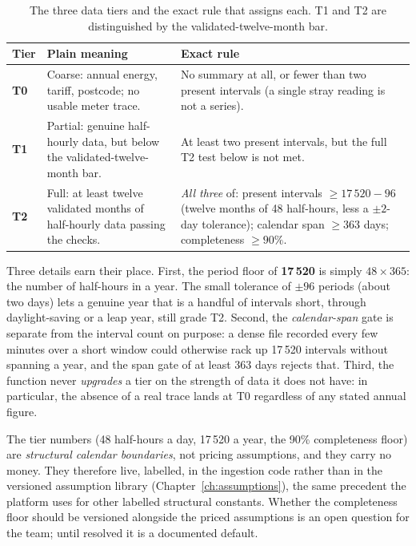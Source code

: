 \begin{table}[H]
\centering
\caption{The three data tiers and the exact rule that assigns each. T1 and T2 are distinguished by the validated-twelve-month bar.}
\label{tab:tiers-ingestion}
\small\sffamily
\begin{tabularx}{\textwidth}{@{}l L L@{}}
\toprule
\textbf{Tier} & \textbf{Plain meaning} & \textbf{Exact rule} \\
\midrule
\textbf{T0} & Coarse: annual energy, tariff, postcode; no usable meter trace. & No summary at all, or fewer than two present intervals (a single stray reading is not a series). \\
\textbf{T1} & Partial: genuine half-hourly data, but below the validated-twelve-month bar. & At least two present intervals, but the full T2 test below is not met. \\
\textbf{T2} & Full: at least twelve validated months of half-hourly data passing the checks. & \emph{All three} of: present intervals $\ge 17\,520 - 96$ (twelve months of 48 half-hours, less a $\pm 2$-day tolerance); calendar span $\ge 363$ days; completeness $\ge 90\%$. \\
\bottomrule
\end{tabularx}
\end{table}

Three details earn their place. First, the period floor of \textbf{17\,520} is simply $48 \times 365$: the number of half-hours in a year. The small tolerance of $\pm 96$ periods (about two days) lets a genuine year that is a handful of intervals short, through daylight-saving or a leap year, still grade T2. Second, the \emph{calendar-span} gate is separate from the interval count on purpose: a dense file recorded every few minutes over a short window could otherwise rack up 17\,520 intervals without spanning a year, and the span gate of at least 363 days rejects that. Third, the function never \emph{upgrades} a tier on the strength of data it does not have: in particular, the absence of a real trace lands at T0 regardless of any stated annual figure.

\begin{caution}
The tier numbers (48 half-hours a day, 17\,520 a year, the 90\% completeness floor) are \emph{structural calendar boundaries}, not pricing assumptions, and they carry no money. They therefore live, labelled, in the ingestion code rather than in the versioned assumption library (Chapter~\ref{ch:assumptions}), the same precedent the platform uses for other labelled structural constants. Whether the completeness floor should be versioned alongside the priced assumptions is an open question for the team; until resolved it is a documented default.
\end{caution}

